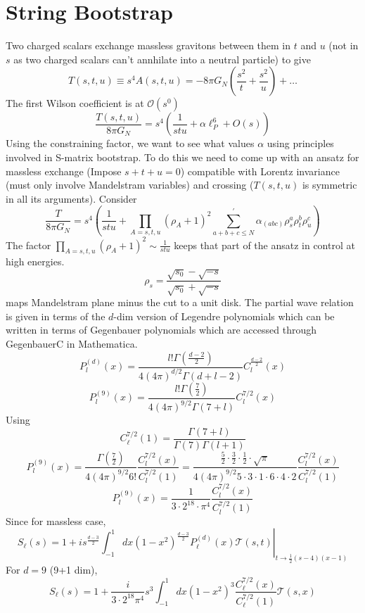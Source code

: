 ﻿\documentclass[12pt,a4paper]{article}
\begin{document}
\section{String Bootstrap}
Two charged scalars exchange massless gravitons between them in $t$ and $u$ (not in $s$ as two charged scalars can't annhilate into a neutral particle) to give \cite{8}
$$
T(s, t, u) \equiv s^{4} A(s, t, u)=-8 \pi G_{N}\left(\frac{s^{2}}{t}+\frac{s^{2}}{u}\right)+\ldots
$$
The first Wilson coefficient is at $\mathcal{O}(s^{0})$
$$
\frac{T(s, t, u)}{8 \pi G_{N}}=s^{4}\left(\frac{1}{s t u}+\alpha \ell_{P}^{6}+O(s)\right)
$$
Using the constraining factor, we want to see what values $\alpha$ using principles involved in S-matrix bootstrap. To do this we need to come up with an ansatz for massless exchange (Impose $s+t+u=0$) compatible with Lorentz invariance (must only involve Mandelstram variables) and crossing ($T(s,t,u)$ is symmetric in all its arguments). Consider
$$
\frac{T}{8 \pi G_{N}}=s^{4}\left(\frac{1}{s t u}+\prod_{A=s, t, u}\left(\rho_{A}+1\right)^{2} \sum_{a+b+c \leq N}^{\prime} \alpha_{(a b c)} \rho_{s}^{a} \rho_{t}^{b} \rho_{u}^{c}\right)
$$
The factor $\prod_{A=s, t, u}\left(\rho_{A}+1\right)^{2} \sim \frac{1}{s t u}$ keeps that part of the ansatz in control at high energies.
$$
\rho_{s} = \frac{\sqrt{s_{0}}-\sqrt{-s}}{\sqrt{s_{0}}+\sqrt{-s}}
$$
maps Mandelstram plane minus the cut to a unit disk. The partial wave relation is given in terms of the $d$-dim version of Legendre polynomials which can be written in terms of Gegenbauer polynomials which are accessed through GegenbauerC in Mathematica.
$$
P_{l}^{(d)}(x)=\frac{l ! \Gamma\left(\frac{d-2}{2}\right)}{4(4 \pi)^{d / 2} \Gamma(d+l-2)} C_{l}^{\frac{d-2}{2}}(x)
$$
$$
P_{l}^{(9)}(x)=\frac{l ! \Gamma\left(\frac{7}{2}\right)}{4(4 \pi)^{9 / 2} \Gamma(7+l)} C_{l}^{7/2}(x)
$$
Using
$$
C_{\ell}^{7/2}(1)=\frac{\Gamma(7+l)}{\Gamma(7)\Gamma(l+1)}
$$
$$
P_{l}^{(9)}(x)=\frac{ \Gamma\left(\frac{7}{2}\right)}{4(4 \pi)^{9 / 2} 6!} \frac{C_{l}^{7/2}(x)}{C_{l}^{7/2}(1)}=\frac{\frac{5}{2}\cdot\frac{3}{2}\cdot\frac{1}{2}\cdot\sqrt{\pi}}{4(4 \pi)^{9 / 2} 5\cdot3\cdot1\cdot6\cdot4\cdot2} \frac{C_{l}^{7/2}(x)}{C_{l}^{7/2}(1)}
$$
$$
P_{l}^{(9)}(x)=\frac{1}{3\cdot 2^{18}\cdot \pi^{4}} \frac{C_{l}^{7/2}(x)}{C_{l}^{7/2}(1)}
$$
Since for massless case,
$$
S_{\ell}(s)=1+\left.i s^{\frac{d-3}{2}} \int_{-1}^{1} d x\left(1-x^{2}\right)^{\frac{d-3}{2}} P_{\ell}^{(d)}(x) \mathcal{T}(s, t)\right|_{t \rightarrow \frac{1}{2}(s-4)(x-1)}
$$
For $d=9$ (9+1 dim),
$$
S_{\ell}(s)=1+\frac{i}{3 \cdot 2^{18} \pi^{4}} s^{3} \int_{-1}^{1} d x\left(1-x^{2}\right)^{3} \frac{C_{\ell}^{7 / 2}(x)}{C_{\ell}^{7 / 2}(1)} \mathcal{T}(s, x)
$$
\end{document}
